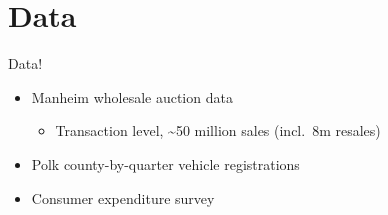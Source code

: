 \documentclass[aspectratio=169]{beamer}
\begin{document}
\section{Data}
\begin{frame}{Data!}
	\begin{itemize}
		\item Manheim wholesale auction data
		\begin{itemize}
			\item Transaction level, \textasciitilde 50 million sales (incl.\ 8m resales)
		\end{itemize}
		\item Polk county-by-quarter vehicle registrations
		\item Consumer expenditure survey
	\end{itemize}
\end{frame}
\end{document}
